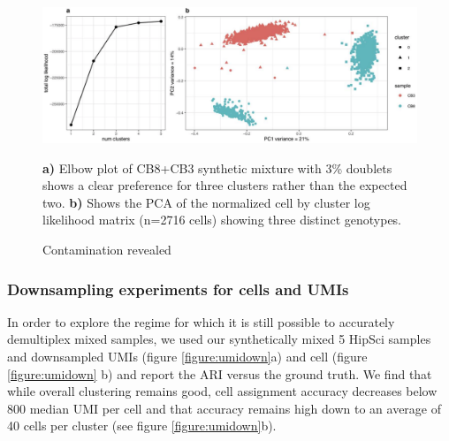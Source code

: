 \begin{figure}[htbp!]
\caption{Contamination revealed}
\label{figure:contamination}
\begin{centering}

\includegraphics[width=\textwidth]{contamination.png} 
\par{\textbf{a)} Elbow plot of CB8+CB3 synthetic mixture with 3\% doublets shows a clear preference for three clusters rather than the expected two.
\textbf{b)} Shows the PCA of the normalized cell by cluster log likelihood matrix (n=2716 cells) showing three distinct genotypes.}

\end{centering}
\end{figure}

\subsubsection{Downsampling experiments for cells and UMIs}

\par{
In order to explore the regime for which it is still possible to accurately demultiplex mixed samples, we
used our synthetically mixed 5 HipSci samples and downsampled UMIs (figure \ref{figure:umidown}a) and cell (figure \ref{figure:umidown}
b) and report the ARI versus the ground truth. We find that while overall clustering remains good, cell
assignment accuracy decreases below 800 median UMI per cell and that accuracy remains high down to
an average of 40 cells per cluster (see figure \ref{figure:umidown}b). 
}

